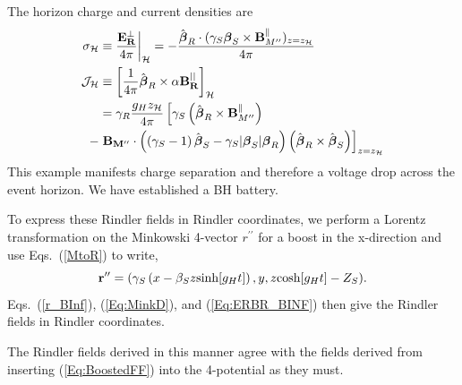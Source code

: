 The horizon charge and current densities are
\begin{align}
\sigma_{\mathcal{H}} &\equiv \frac{\bf{E^{\perp}_R}}{4 \pi} \bigg{|}_{\mathcal{H}} = -\frac{ \hat{{\boldsymbol \beta}}_R \cdot (\gamma_S {\boldsymbol \beta}_S \times  \mathbf{B}^\parallel_{M^{\prime \prime}}  )_{z=z_\mathcal{H}}  }{4 \pi}   \nonumber \\
\mathbf{\mathcal{J}_\mathcal{H}} &\equiv \left[ \frac{1}{4 \pi}    \hat{{\boldsymbol \beta}}_R \times  \alpha \mathbf{B_R^{||}}  \right]_{\mathcal{H}}  \nonumber \\
&= \gamma_R  \frac{g_H z_\mathcal{H}}{4 \pi}  \left[ \gamma_S  \left(    \hat{{\boldsymbol \beta}}_R \times  \mathbf{B}^\parallel_{M^{\prime \prime}}    \right)\right. \nonumber \\
-& \left.     \mathbf{ B_{M^{\prime \prime}}}  \cdot  \left( \left(\gamma_S -1 \right) \hat{{\boldsymbol \beta}}_S  - \gamma_S |{\boldsymbol \beta}_S| {\boldsymbol \beta}_R\right)      \left(\hat{{\boldsymbol \beta}}_R \times \hat{{\boldsymbol \beta}}_S \right) \right]_{z=z_\mathcal{H}} 
\label{SHJH_BINF}
\end{align}
This example manifests charge separation and therefore a voltage drop
across the event horizon. We have established a BH battery. 

To express these Rindler fields in Rindler coordinates, we perform a 
Lorentz transformation on the Minkowski 4-vector $r^{\prime \prime}$ 
for a boost in the x-direction and use Eqs.\ (\ref{MtoR}) to write,
\begin{equation}
{\bf r}^{\prime \prime} = (\gamma_S \left(x-\beta_S z \hbox{sinh}[g_H t] \right), y, z \hbox{cosh}[g_H t] -Z_S).
\label{r_BInf}
\end{equation}
Eqs.\ (\ref{r_BInf}), (\ref{Eq:MinkD}), and (\ref{Eq:ERBR_BINF}) then give the Rindler fields in Rindler coordinates.

The Rindler fields derived in this manner agree with the fields
derived from inserting (\ref{Eq:BoostedFF}) into the 4-potential as
they must.

